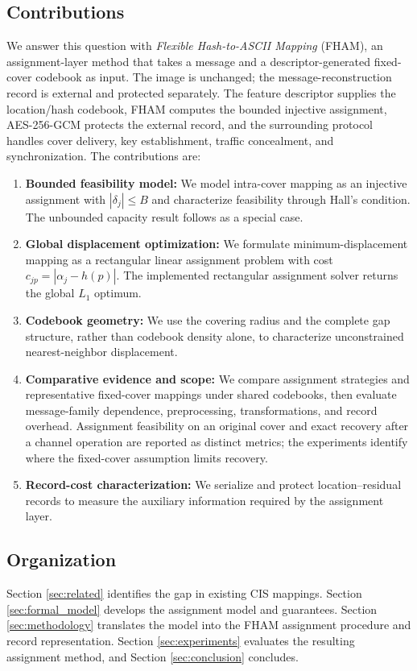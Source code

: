 \documentclass[preprint,12pt]{elsarticle}
\theoremstyle{plain}
\begin{document}
\subsection{Contributions}
We answer this question with \textit{Flexible Hash-to-ASCII Mapping} (FHAM), an assignment-layer method that takes a message and a descriptor-generated fixed-cover codebook as input. The image is unchanged; the message-reconstruction record is external and protected separately. The feature descriptor supplies the location/hash codebook, FHAM computes the bounded injective assignment, AES-256-GCM protects the external record, and the surrounding protocol handles cover delivery, key establishment, traffic concealment, and synchronization. The contributions are:
\begin{enumerate}
    \item \textbf{Bounded feasibility model:} We model intra-cover mapping as an injective assignment with $|\delta_j|\leq B$ and characterize feasibility through Hall's condition. The unbounded capacity result follows as a special case.

    \item \textbf{Global displacement optimization:} We formulate minimum-displacement mapping as a rectangular linear assignment problem with cost $c_{jp}=|\alpha_j-h(p)|$. The implemented rectangular assignment solver returns the global $L_1$ optimum.

    \item \textbf{Codebook geometry:} We use the covering radius and the complete gap structure, rather than codebook density alone, to characterize unconstrained nearest-neighbor displacement.

    \item \textbf{Comparative evidence and scope:} We compare assignment strategies and representative fixed-cover mappings under shared codebooks, then evaluate message-family dependence, preprocessing, transformations, and record overhead. Assignment feasibility on an original cover and exact recovery after a channel operation are reported as distinct metrics; the experiments identify where the fixed-cover assumption limits recovery.

    \item \textbf{Record-cost characterization:} We serialize and protect location--residual records to measure the auxiliary information required by the assignment layer.
\end{enumerate}

\subsection{Organization}
Section \ref{sec:related} identifies the gap in existing CIS mappings. Section \ref{sec:formal_model} develops the assignment model and guarantees. Section \ref{sec:methodology} translates the model into the FHAM assignment procedure and record representation. Section \ref{sec:experiments} evaluates the resulting assignment method, and Section \ref{sec:conclusion} concludes.
\end{document}

